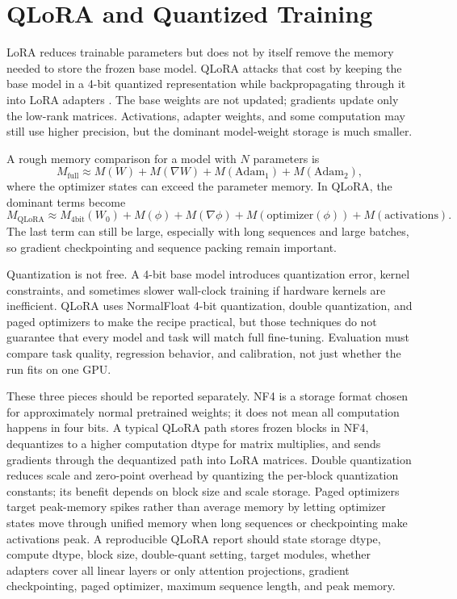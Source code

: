 \section{QLoRA and Quantized Training}
\label{sec:qlora-quantized-training}

LoRA reduces trainable parameters but does not by itself remove the memory needed to store the frozen base model. QLoRA attacks that cost by keeping the base model in a 4-bit quantized representation while backpropagating through it into LoRA adapters \cite{dettmers2023qlora}. The base weights are not updated; gradients update only the low-rank matrices. Activations, adapter weights, and some computation may still use higher precision, but the dominant model-weight storage is much smaller.

A rough memory comparison for a model with $N$ parameters is
\begin{equation}
  M_{\mathrm{full}} \approx M(W) + M(\nabla W) + M(\mathrm{Adam}_1) + M(\mathrm{Adam}_2),
  \label{eq:full-ft-memory}
\end{equation}
where the optimizer states can exceed the parameter memory. In QLoRA, the dominant terms become
\begin{equation}
  M_{\mathrm{QLoRA}} \approx M_{\mathrm{4bit}}(W_0) + M(\phi) + M(\nabla \phi) +
  M(\mathrm{optimizer}(\phi)) + M(\mathrm{activations}).
  \label{eq:qlora-memory}
\end{equation}
The last term can still be large, especially with long sequences and large batches, so gradient checkpointing and sequence packing remain important.

Quantization is not free. A 4-bit base model introduces quantization error, kernel constraints, and sometimes slower wall-clock training if hardware kernels are inefficient. QLoRA uses NormalFloat 4-bit quantization, double quantization, and paged optimizers to make the recipe practical, but those techniques do not guarantee that every model and task will match full fine-tuning. Evaluation must compare task quality, regression behavior, and calibration, not just whether the run fits on one GPU.

These three pieces should be reported separately. NF4 is a storage format chosen for approximately normal pretrained weights; it does not mean all computation happens in four bits. A typical QLoRA path stores frozen blocks in NF4, dequantizes to a higher computation dtype for matrix multiplies, and sends gradients through the dequantized path into LoRA matrices. Double quantization reduces scale and zero-point overhead by quantizing the per-block quantization constants; its benefit depends on block size and scale storage. Paged optimizers target peak-memory spikes rather than average memory by letting optimizer states move through unified memory when long sequences or checkpointing make activations peak. A reproducible QLoRA report should state storage dtype, compute dtype, block size, double-quant setting, target modules, whether adapters cover all linear layers or only attention projections, gradient checkpointing, paged optimizer, maximum sequence length, and peak memory.

